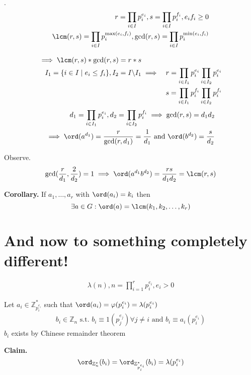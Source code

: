 \Proof.
\begin{align*}
  r = \prod_{i\in I} p_i^{e_i}, s = \prod_{i\in I} p_i^{f_i},   e_i f_i \geq 0\\
  \lcm(r,s) = \prod_{i\in I} p_i^{\max(e_i,f_i)}, \gcd(r,s) = \prod_{i\in I} p_i^{\min(e_i,f_i)}
\end{align*}

\begin{align*}
  \implies \lcm(r,s) * \gcd(r,s) = r*s\\
  I_1 = \{i \in I \mid e_i \leq f_i\}, I_2 = I \backslash I_1 
  & \implies
     & r = \prod_{i\in I_1} p_i^{e_i} \prod_{i\in I_2} p_i^{e_i} \\
    && s = \prod_{i\in I_1} p_i^{f_i} \prod_{i\in I_2} p_i^{f_i} \\
\end{align*}
\begin{align*}
  d_1 = \prod_{i\in I_1} p_i^{e_i}, d_2 = \prod_{i\in I_2} p_i^{f_i} \implies \gcd(r,s) = d_1 d_2 \\
  \implies \ord(a^{d_1}) = \frac{r}{\gcd(r,d_1)} = \frac{1}{d_1} \text{ and } \ord(b^{d_2}) = \frac{s}{d_2}
\end{align*}

Observe.
\begin{align*}
  \gcd(\frac{r}{d_1}, \frac{2}{d_2} ) = 1 
    \implies \ord(a^{d_1} b^{d_2}) =
    \frac{rs}{d_1 d_2} = \lcm(r,s)
\end{align*}

\textbf{Corollary.}
If $a_1, \ldots, a_r$ with $\ord(a_i) = k_i$ then 
\[
  \exists a \in G: \ord(a) = \lcm(k_1, k_2, \ldots, k_r)
\]


\section{And now to something completely different!}
\begin{align*}
  \lambda(n), n = \prod_{i = 1}^{r} p_i^{e_i}, e_i > 0
\end{align*}

Let $ a_i \in \mathbb{Z}_{p_i^{e_i}}^{*}$ such that $ \ord(a_i) = \varphi(p_i^{e_i}) = \lambda(p_i^{e_i})$
\begin{align*}
  b_i \in \mathbb{Z}_n \text{ s.t. } b_i \equiv 1 (p_j^{e_j}) \forall j \neq i \text{ and } b_i \equiv a_i (p_i^{e_i})
\end{align*}
$b_i$ exists by Chinese remainder theorem

\textbf{Claim.}
\[
  \ord_{\mathbb{Z}_n^{*}}(b_i) = \ord_{\mathbb{Z}_{p_i^{e_i}}^{*}} (b_i) = \lambda(p_i^{e_i})
\]

